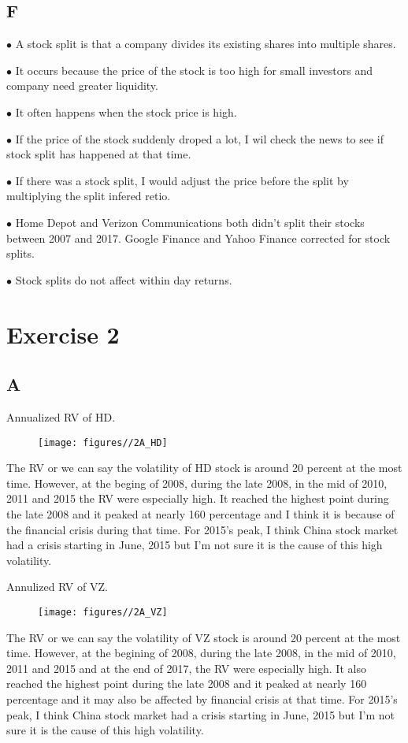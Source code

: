 \documentclass{report}
\begin{document}
\subsection{F}

$\bullet$ A stock split is that a company divides its existing shares into multiple shares. 

$\bullet$ It occurs because the price of the stock is too high for small investors and company need greater liquidity. 

$\bullet$ It often happens when the stock price is high. 

$\bullet$ If the price of the stock suddenly droped a lot, I wil check the news to see if stock split has happened at that time. 

$\bullet$ If there was a stock split, I would adjust the price before the split by multiplying the split infered retio.

$\bullet$ Home Depot and Verizon Communications both didn't split their stocks between 2007 and 2017. Google Finance and Yahoo Finance corrected for stock splits. 

$\bullet$ Stock splits do not affect within day returns.

\section{ Exercise 2}
\subsection{A}
Annualized RV of HD.
\begin{figure}[H]
        \centering 
         \texttt{[image: figures//2A\_HD]}
\end{figure}
The RV or we can say the volatility of HD stock is around 20 percent at the most time. However, at the beging of 2008, during the late 2008, in the mid of 2010, 2011 and 2015 the RV were especially high. It reached the highest point during the late 2008 and it peaked at nearly 160 percentage and I think it is because of the financial crisis during that time. For 2015's peak, I think China stock market had a crisis starting in June, 2015 but I'm not sure it is the cause of this high volatility.

Annulized RV of VZ.
\begin{figure}[H]
        \centering 
         \texttt{[image: figures//2A\_VZ]}
\end{figure}
The RV or we can say the volatility of VZ stock is around 20 percent at the most time. However, at the begining of 2008, during the late 2008, in the mid of 2010, 2011 and 2015 and at the end of 2017, the RV were especially high. It also reached the highest point during the late 2008 and it peaked at nearly 160 percentage and it may also be affected by financial crisis at that time. For 2015's peak, I think China stock market had a crisis starting in June, 2015 but I'm not sure it is the cause of this high volatility.
\end{document}
